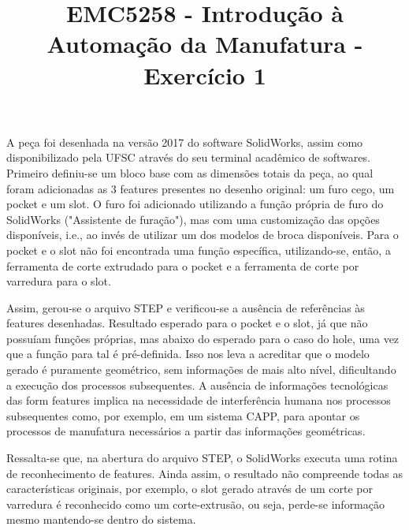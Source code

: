 \documentclass[a4paper]{report}
\title{EMC5258 - Introdução à Automação da Manufatura - Exercício 1}
\begin{document}
\maketitle

A peça foi desenhada na versão 2017 do software SolidWorks, assim como disponibilizado pela UFSC através do seu terminal acadêmico de softwares. Primeiro definiu-se um bloco base com as dimensões totais da peça, ao qual foram adicionadas as 3 features presentes no desenho original: um furo cego, um pocket e um slot. O furo foi adicionado utilizando a função própria de furo do SolidWorks ("Assistente de furação"), mas com uma customização das opções disponíveis, i.e., ao invés de utilizar um dos modelos de broca disponíveis. Para o pocket e o slot não foi encontrada uma função específica, utilizando-se, então, a ferramenta de corte extrudado para o pocket e a ferramenta de corte por varredura para o slot.

Assim, gerou-se o arquivo STEP e verificou-se a ausência de referências às features desenhadas. Resultado esperado para o pocket e o slot, já que não possuíam funções próprias, mas abaixo do esperado para o caso do hole, uma vez que a função para tal é pré-definida. Isso nos leva a acreditar que o modelo gerado é puramente geométrico, sem informações de mais alto nível, dificultando a execução dos processos subsequentes. A ausência de informações tecnológicas das form features implica na necessidade de interferência humana nos processos subsequentes como, por exemplo, em um sistema CAPP, para apontar os processos de manufatura necessários a partir das informações geométricas.

Ressalta-se que, na abertura do arquivo STEP, o SolidWorks executa uma rotina de reconhecimento de features. Ainda assim, o resultado não compreende todas as características originais, por exemplo, o slot gerado através de um corte por varredura é reconhecido como um corte-extrusão, ou seja, perde-se informação mesmo mantendo-se dentro do sistema.
\end{document}
